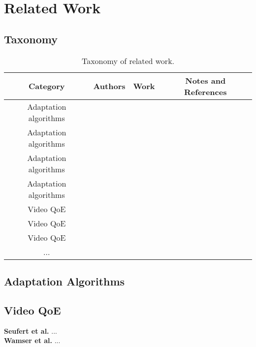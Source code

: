 
\section{Related Work}\label{sec:relatedwork}

\subsection{Taxonomy}

\begin{table}[h!]
\centering
\caption{Taxonomy of related work.}
\begin{tabular}{|c|c|c|c|}
\hline
\textbf{Category} & \textbf{Authors} & \textbf{Work} & \textbf{Notes and References} \\
\hline
Adaptation algorithms & & & \\
\hline
Adaptation algorithms & & & \\
\hline
Adaptation algorithms & & & \\
\hline
Adaptation algorithms & & & \\
\hline
Video \ac{QoE} & & & \\
\hline
Video \ac{QoE} & & & \\
\hline
Video \ac{QoE} & & & \\
\hline
... & & & \\
\hline
\end{tabular}
\label{tab:relatedwork}
\end{table}

\subsection{Adaptation Algorithms}


\subsection{Video \ac{QoE}}

\textbf{Seufert et al.} ... \\%

\textbf{Wamser et al.} ... \\%
